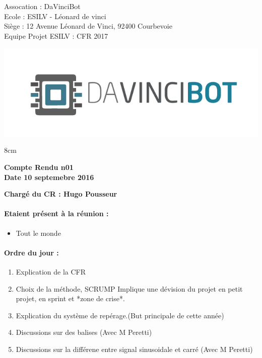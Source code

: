 \documentclass[12pt]{report}
\begin{document}
\begin{minipage}{0.55\linewidth}
\noindent Assocation : DaVinciBot\\
Ecole : ESILV - Léonard de vinci\\
Siège :  12 Avenue Léonard de Vinci, 92400 Courbevoie\\
Equipe Projet ESILV : CFR 2017\\
\end{minipage}\hfill
\begin{minipage}{0.3\linewidth}
\includegraphics[scale = 0.2]{img/logo_assos.png}
\end{minipage}
\vspace{1cm}



\begin{center}
\begin {boxedminipage} [ poslb ] { 8cm}
\begin{center}
\textbf{Compte Rendu n01}\\
\textbf{Date 10 septemebre 2016}
\end{center}
\end {boxedminipage}
\end{center}
\textbf{Chargé du CR : Hugo Pousseur}

\vspace{1cm}

\paragraph{Etaient présent à la réunion :}
\begin{itemize}
\item Tout le monde
\end{itemize}


\paragraph{Ordre du jour :}
\begin{enumerate}
 \item Explication de la CFR 
 \item Choix de la méthode, SCRUMP Implique une dévision du projet en petit projet, en sprint et *zone de crise*.
 \item Explication du système de repérage.(But principale de cette année)
 \item Discussions sur des balises (Avec M Peretti)
 \item Discussions sur la différene entre signal sinusoidale et carré (Avec M Peretti)
\end{enumerate}
\end{document}
